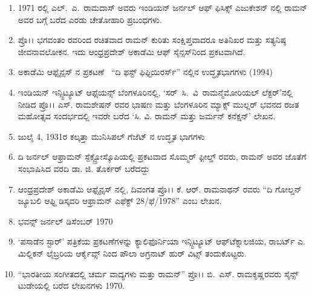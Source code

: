 \begin{enumerate}
\item 1971 ರಲ್ಲಿ ಎಲ್.~ಎ.~ರಾಮದಾಸ್ ಅವರು ಇಂಡಿಯನ್ ಜರ್ನಲ್ ಆಫ್‌ ಫಿಸಿಕ್ಸ್ ಎಜುಕೇಶನ್ ನಲ್ಲಿ ರಾಮನ್ ಅವರ ಬಗ್ಗೆ ಬರೆದ ಎರಡು ಚೇತೋಹಾರಿ ಪ್ರಬಂಧಗಳು.

\smallskip

\item ಪ್ರೊ।। ಭಗವಂತಂ ರವರಿಂದ ರಚಿತವಾದ ರಾಮನ್ ಕುರಿತು ಸಂಕ್ಷಿಪ್ತವಾದರೂ ಅತಿನಿಖರ ಮತ್ತು ಸತ್ಯನಿಷ್ಠ ಜೀವನಾವಲೋಕನ. ಇದು ಆಂಧ್ರಪ್ರದೇಶ್ ಅಕಾಡೆಮಿ ಆಫ್‌ ಸೈನ್ಸಸ್‌ನಿಂದ ಪ್ರಕಟವಾಗಿದೆ.

\smallskip

\item ಅಕಾಡೆಮಿ ಆಫ್ಸೈನ್ಸಸ್ ನ ಪ್ರಕಟಣೆ ~“ದಿ ಫಸ್ಟ್ ಫಿಫ್ಟಿಯಿರರ್ಸ್” ನಲ್ಲಿನ ಉದ್ಧೃತ\break ಭಾಗಗಳು (1994)

\smallskip

\item ಇಂಡಿಯನ್ ಇನ್ಸ್ಟಿಟ್ಯೂಟ್ ಆಫ್ಸೆಯನ್ಸ್ ಬೆಂಗಳೂರಿನಲ್ಲಿ, ‘ಸರ್~ಸಿ.~ವಿ~ರಾಮನ್\break ಮೆಮೋರಿಯಲ್ ಲೆಕ್ಟರ್’ನಲ್ಲಿ~ ನೀಡಿದ ಪ್ರೊ।। ಎಸ್. ರಾಮಶೇಷನ್ ರವರ ಭಾಷಣ ಮತ್ತು ಬೆಂಗಳೂರಿನ ಮ್ಯಾಕ್ಸ್ ಮುಲ್ಲರ್ ಭವನದ ರಜತ ಮಹೋತ್ಸವ ಸಂದರ್ಭದಲ್ಲಿ ಇವರೇ ಬರೆದ ‘ಸಿ. ವಿ. ರಾಮನ್ ಮತ್ತು ಜರ್ಮನ್ ಕನೆಕ್ಷನ್’ ಲೇಖನ. 

\smallskip

\item ಜುಲೈ 4, 1931ರ ಕಲ್ಕತ್ತಾ ಮುನಿಸಿಪಲ್ ಗೆಜೆಟ್ ನ ಉದ್ಧೃತ ಭಾಗಗಳು

\smallskip

\item  ದಿ ಜರ್ನಲ್ ಆಫ್ರಾಮನ್ ಸ್ಪೆಕ್ಟ್ರೋಸ್ಕೊಪಿಯಲ್ಲಿ ಪ್ರಕಟವಾದ ಸೊಮ್ಮರ್ ಫಿ಼ೕಲ್ಡ್ ರವರು, ರಾಮನ್ ಅವರ ಜೊತೆಗೆ ಸಂಭಾಷಿಸಿದ ವರದಿ\enginline{-} ಡಾ. ಜಿ. ತೊರ್ಕರ್ ಬರೆದದ್ದು

\smallskip

\item ಆಂಧ್ರಪ್ರದೇಶ್ ಅಕಾಡೆಮಿ ಆಫ್ಸೈನ್ಸಸ್ ನಲ್ಲಿ, ದಿವಂಗತ ಪ್ರೊ।। ಕೆ. ಆರ್. ರಾಮನಾಥನ್ ರವರು “ದಿ ಗೋಲ್ಡನ್ ಜ್ಯೂಬಲಿ ಆಫ್ದಿ ಡಿಸ್ಕವರಿ ಆಫ್ರಾಮನ್ ಎಫೆಕ್ಟ್ 28/ಫೆ/1978” ಎಂಬ ಲೇಖನ. 

\smallskip

\item ಭವನ್ಸ್ ಜರ್ನಲ್ ಡಿಸೆಂಬರ್ 1970

\smallskip

\item  ‘ಪಸಾಡೆನ ಸ್ಟಾರ್’ ಪತ್ರಿಕೆಯ ಪ್ರಕಟಣೆಗಳನ್ನು ಕ್ಯಾಲಿಫೊರ್ನಿಯಾ ಇನ್ಸ್ಟಿಟ್ಯೂಟ್ ಆಫ್‌\break ಟೆಕ್ನಾಲಜಿಯ, ರಾಬರ್ಟ್ ಎ. ಮಿಲ್ಲಿಕನ್ ಲೈಬ್ರರಿಯ ಆರ್ಕೈವ್ಸ್ ನಿಂದ ಪೌಲಾ ಅಗ್ರನಾಟ್ ಹುರ್ ವಿಟ್ಸ್  ತಂದುಕೊಟ್ಟರು.

\smallskip

\item  “ಭಾರತೀಯ ಸಂಗೀತದಲ್ಲಿ ಚರ್ಮ ವಾದ್ಯಗಳು ಮತ್ತು ರಾಮನ್” \enginline{--}ಪ್ರೊ।। ಬಿ.~ಎಸ್. ರಾಮಕೃಷ್ಣರವರು ಸೈನ್ಸ್ ಟುಡೇಯಲ್ಲಿ ಬರೆದ ಲೇಖನಗಳು 1970.
\end{enumerate}

